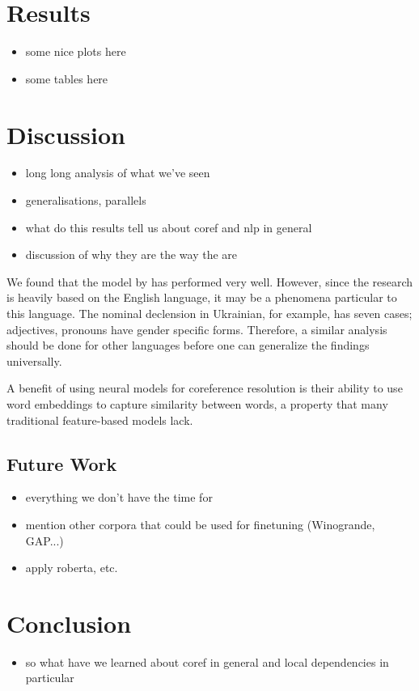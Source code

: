 \documentclass[11pt]{article}
\begin{document}
\section{Results}
\begin{itemize}
\item some nice plots here
\item some tables here
\end{itemize}

\section{Discussion}

\begin{itemize}
\item long long analysis of what we've seen
\item generalisations, parallels
\item what do this results tell us about coref and nlp in general
\item discussion of why they are the way the are
\end{itemize}

We found that the model by \textcite{joshi2019coref} has performed very well. 
However, since the research is heavily based on the English language, it may be a phenomena particular to this language. The nominal declension in Ukrainian, for example, has seven cases; adjectives, pronouns have gender specific forms. Therefore, a similar analysis should be done for other languages before one can generalize the findings universally. %

A benefit of using neural models for coreference resolution is their ability to use
word embeddings to capture similarity between words, a property that many traditional feature-based models lack.

\subsection{Future Work}
\begin{itemize}
\item everything we don't have the time for
\item mention other corpora that could be used for finetuning (Winogrande, GAP...)
\item apply roberta, etc.

\end{itemize}

\section{Conclusion}

\begin{itemize}
\item so what have we learned about coref in general and local dependencies in particular
\end{itemize}

\printbibliography
\end{document}
